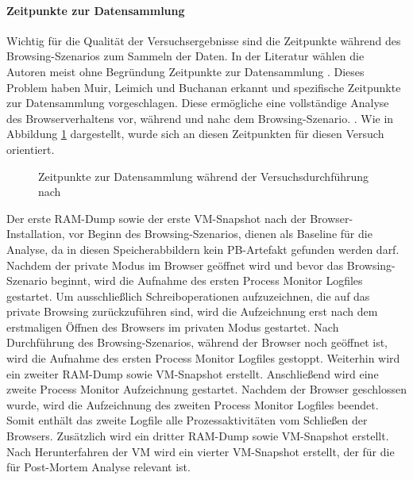 \paragraph*{Zeitpunkte zur Datensammlung}
Wichtig für die Qualität der Versuchsergebnisse sind die Zeitpunkte während des Browsing-Szenarios zum Sammeln der Daten.
In der Literatur wählen die Autoren meist ohne Begründung Zeitpunkte zur Datensammlung \cite{Sajan.2021, Nalawade.2016, Montasari.2015, Satvat.2014, Said.2011, Aggarwal.2010}.
Dieses Problem haben Muir, Leimich und Buchanan erkannt und spezifische Zeitpunkte zur Datensammlung vorgeschlagen. Diese ermögliche eine vollständige Analyse des Browserverhaltens vor, während und nahc dem Browsing-Szenario. \cite{Muir.2019}. Wie in Abbildung \ref{img:zeitpunkte-datensammlung} dargestellt, wurde sich an diesen Zeitpunkten für diesen Versuch orientiert.
\begin{figure}[h!]
	\centering
	\small
	\centerline{\resizebox{\linewidth}{!}{}}
	\caption{Zeitpunkte zur Datensammlung während der Versuchsdurchführung nach \cite{Muir.2019}}
	\label{img:zeitpunkte-datensammlung}
\end{figure}

Der erste RAM-Dump sowie der erste VM-Snapshot nach der Browser-Installation, vor Beginn des Browsing-Szenarios, dienen als Baseline für die Analyse, da in diesen Speicherabbildern kein PB-Artefakt gefunden werden darf.
Nachdem der private Modus im Browser geöffnet wird und bevor das Browsing-Szenario beginnt, wird die Aufnahme des ersten Process Monitor Logfiles gestartet. Um ausschließlich Schreiboperationen aufzuzeichnen, die auf das private Browsing zurückzuführen sind, wird die Aufzeichnung erst nach dem erstmaligen Öffnen des Browsers im privaten Modus gestartet.
Nach Durchführung des Browsing-Szenarios, während der Browser noch geöffnet ist, wird die Aufnahme des ersten Process Monitor Logfiles gestoppt. Weiterhin wird ein zweiter RAM-Dump sowie VM-Snapshot erstellt. Anschließend wird eine zweite Process Monitor Aufzeichnung gestartet. 
Nachdem der Browser geschlossen wurde, wird die Aufzeichnung des zweiten Process Monitor Logfiles beendet. Somit enthält das zweite Logfile alle Prozessaktivitäten vom Schließen der Browsers. Zusätzlich wird ein dritter RAM-Dump sowie  VM-Snapshot erstellt. 
Nach Herunterfahren der VM wird ein vierter VM-Snapshot erstellt, der für die für Post-Mortem Analyse relevant ist.


